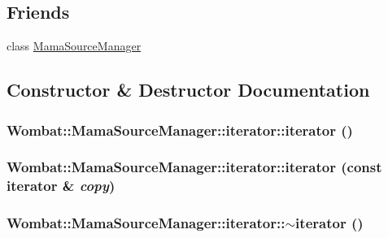 \subsection*{Friends}
\begin{DoxyCompactItemize}
\item 
class \hyperlink{classWombat_1_1MamaSourceManager_1_1iterator_a22e83cca18603c329a5bce3b0389ea75}{MamaSourceManager}
\end{DoxyCompactItemize}


\subsection{Constructor \& Destructor Documentation}
\hypertarget{classWombat_1_1MamaSourceManager_1_1iterator_a6135a7ca51e5ea21a6829124fb7636c8}{
\subsubsection[{iterator}]{\setlength{\rightskip}{0pt plus 5cm}Wombat::MamaSourceManager::iterator::iterator ()}}
\label{classWombat_1_1MamaSourceManager_1_1iterator_a6135a7ca51e5ea21a6829124fb7636c8}
\hypertarget{classWombat_1_1MamaSourceManager_1_1iterator_a207ad4481186eee1f45a4a8ddc84a98c}{
\subsubsection[{iterator}]{\setlength{\rightskip}{0pt plus 5cm}Wombat::MamaSourceManager::iterator::iterator (const {\bf iterator} \& {\em copy})}}
\label{classWombat_1_1MamaSourceManager_1_1iterator_a207ad4481186eee1f45a4a8ddc84a98c}
\hypertarget{classWombat_1_1MamaSourceManager_1_1iterator_a5a003e5144823a7744b07a40ddd27ee7}{
\subsubsection[{$\sim$iterator}]{\setlength{\rightskip}{0pt plus 5cm}Wombat::MamaSourceManager::iterator::$\sim$iterator ()}}
\label{classWombat_1_1MamaSourceManager_1_1iterator_a5a003e5144823a7744b07a40ddd27ee7}


